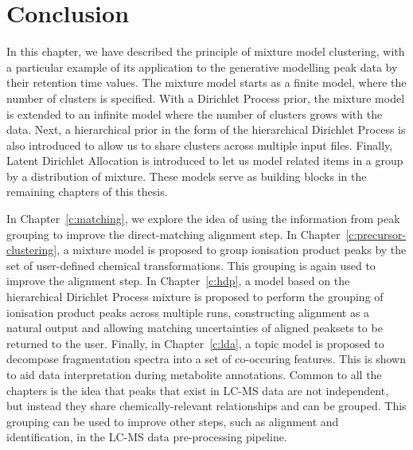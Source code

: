 \section{Conclusion}

In this chapter, we have described the principle of mixture model clustering, with a particular example of its application to the generative modelling peak data by their retention time values. The mixture model starts as a finite model, where the number of clusters is specified. With a Dirichlet Process prior, the mixture model is extended to an infinite model where the number of clusters grows with the data. Next, a hierarchical prior in the form of the hierarchical Dirichlet Process is also introduced to allow us to share clusters across multiple input files. Finally, Latent Dirichlet Allocation is introduced to let us model related items in a group by a distribution of mixture. These models serve as building blocks in the remaining chapters of this thesis. 

In Chapter~\ref{c:matching}, we explore the idea of using the information from peak grouping to improve the direct-matching alignment step. In Chapter~\ref{c:precursor-clustering}, a mixture model is proposed to group ionisation product peaks by the set of user-defined chemical transformations. This grouping is again used to improve the alignment step. In Chapter~\ref{c:hdp}, a model based on the hierarchical Dirichlet Process mixture is proposed to perform the grouping of ionisation product peaks across multiple runs, constructing alignment as a natural output and allowing matching uncertainties of aligned peaksets to be returned to the user. Finally, in Chapter~\ref{c:lda}, a topic model is proposed to decompose fragmentation spectra into a set of co-occuring features. This is shown to aid data interpretation during metabolite annotations. Common to all the chapters is the idea that peaks that exist in LC-MS data are not independent, but instead they share chemically-relevant relationships and can be grouped. This grouping can be used to improve other steps, such as alignment and identification, in the LC-MS data pre-processing pipeline.